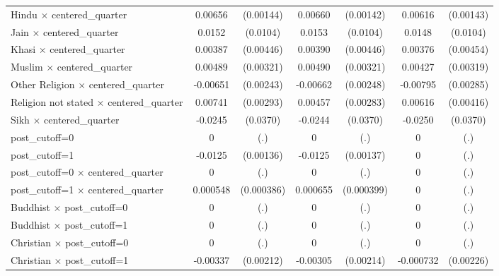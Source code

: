 \begin{table}[htbp]
\begin{tabular}{l*{3}{cc}}
Hindu $\times$ centered\_quarter&     0.00656\sym{***}&   (0.00144)&     0.00660\sym{***}&   (0.00142)&     0.00616\sym{***}&   (0.00143)\\
Jain $\times$ centered\_quarter&      0.0152         &    (0.0104)&      0.0153         &    (0.0104)&      0.0148         &    (0.0104)\\
Khasi $\times$ centered\_quarter&     0.00387         &   (0.00446)&     0.00390         &   (0.00446)&     0.00376         &   (0.00454)\\
Muslim $\times$ centered\_quarter&     0.00489         &   (0.00321)&     0.00490         &   (0.00321)&     0.00427         &   (0.00319)\\
Other Religion $\times$ centered\_quarter&    -0.00651\sym{**} &   (0.00243)&    -0.00662\sym{**} &   (0.00248)&    -0.00795\sym{**} &   (0.00285)\\
Religion not stated $\times$ centered\_quarter&     0.00741\sym{*}  &   (0.00293)&     0.00457         &   (0.00283)&     0.00616         &   (0.00416)\\
Sikh $\times$ centered\_quarter&     -0.0245         &    (0.0370)&     -0.0244         &    (0.0370)&     -0.0250         &    (0.0370)\\
post\_cutoff=0       &           0         &         (.)&           0         &         (.)&           0         &         (.)\\
post\_cutoff=1       &     -0.0125\sym{***}&   (0.00136)&     -0.0125\sym{***}&   (0.00137)&           0         &         (.)\\
post\_cutoff=0 $\times$ centered\_quarter&           0         &         (.)&           0         &         (.)&           0         &         (.)\\
post\_cutoff=1 $\times$ centered\_quarter&    0.000548         &  (0.000386)&    0.000655         &  (0.000399)&           0         &         (.)\\
Buddhist $\times$ post\_cutoff=0&           0         &         (.)&           0         &         (.)&           0         &         (.)\\
Buddhist $\times$ post\_cutoff=1&           0         &         (.)&           0         &         (.)&           0         &         (.)\\
Christian $\times$ post\_cutoff=0&           0         &         (.)&           0         &         (.)&           0         &         (.)\\
Christian $\times$ post\_cutoff=1&    -0.00337         &   (0.00212)&    -0.00305         &   (0.00214)&   -0.000732         &   (0.00226)\\

\end{tabular}
\end{table}
